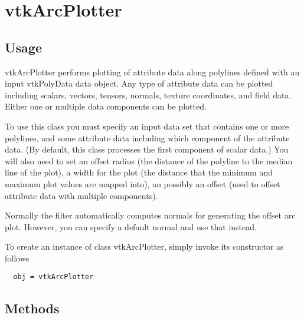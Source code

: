 \section{vtkArcPlotter}

\subsection{Usage}

 vtkArcPlotter performs plotting of attribute data along polylines defined
 with an input vtkPolyData data object. Any type of attribute data can be
 plotted including scalars, vectors, tensors, normals, texture coordinates,
 and field data. Either one or multiple data components can be plotted.
 
 To use this class you must specify an input data set that contains one or
 more polylines, and some attribute data including which component of the
 attribute data. (By default, this class processes the first component of
 scalar data.) You will also need to set an offset radius (the distance
 of the polyline to the median line of the plot), a width for the plot
 (the distance that the minimum and maximum plot values are mapped into),
 an possibly an offset (used to offset attribute data with multiple
 components).
 
 Normally the filter automatically computes normals for generating the
 offset arc plot. However, you can specify a default normal and use that
 instead.

To create an instance of class vtkArcPlotter, simply
invoke its constructor as follows
\begin{verbatim}
  obj = vtkArcPlotter
\end{verbatim}
\subsection{Methods}

